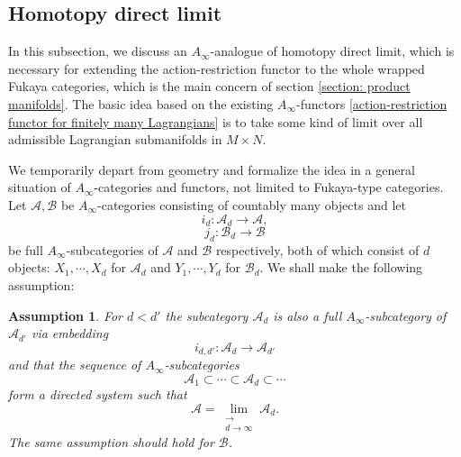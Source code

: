 \documentclass{amsart}
\newtheorem{assumption}[theorem]{Assumption}
\numberwithin{equation}{section}
\numberwithin{figure}{section}
\begin{document}
\subsection{Homotopy direct limit} \label{A-infinity homotopy direct limit}
	In this subsection, we discuss an $A_{\infty}$-analogue of homotopy direct limit, which is necessary for extending the action-restriction functor to the whole wrapped Fukaya categories, which is the main concern of section \ref{section: product manifolds}. The basic idea based on the existing $A_{\infty}$-functors \eqref{action-restriction functor for finitely many Lagrangians} is to take some kind of limit over all admissible Lagrangian submanifolds in $M \times N$. \par
	We temporarily depart from geometry and formalize the idea in a general situation of $A_{\infty}$-categories and functors, not limited to Fukaya-type categories. Let $\mathcal{A}, \mathcal{B}$ be $A_{\infty}$-categories consisting of countably many objects and let
\begin{equation*}
i_{d}: \mathcal{A}_{d} \to \mathcal{A},
\end{equation*}
\begin{equation*}
j_{d}: \mathcal{B}_{d} \to \mathcal{B}
\end{equation*} be full $A_{\infty}$-subcategories of $\mathcal{A}$ and $\mathcal{B}$ respectively, both of which consist of $d$ objects: $X_{1}, \cdots, X_{d}$ for $\mathcal{A}_{d}$ and $Y_{1}, \cdots, Y_{d}$ for $\mathcal{B}_{d}$. We shall make the following assumption:
\begin{assumption} \label{direct limit assumption on subcategories}
For $d < d'$ the subcategory $\mathcal{A}_{d}$ is also a full $A_{\infty}$-subcategory of $\mathcal{A}_{d'}$ via embedding
\begin{equation*}
i_{d, d'}: \mathcal{A}_{d} \to \mathcal{A}_{d'}
\end{equation*}
and that the sequence of $A_{\infty}$-subcategories
\begin{equation}
\mathcal{A}_{1} \subset \cdots \subset \mathcal{A}_{d} \subset \cdots
\end{equation}
form a directed system such that
\begin{equation}
\mathcal{A} = \lim\limits_{\substack{\longrightarrow\\ d \to \infty}} \mathcal{A}_{d}.
\end{equation}
The same assumption should hold for $\mathcal{B}$.
\end{assumption}
\end{document}
